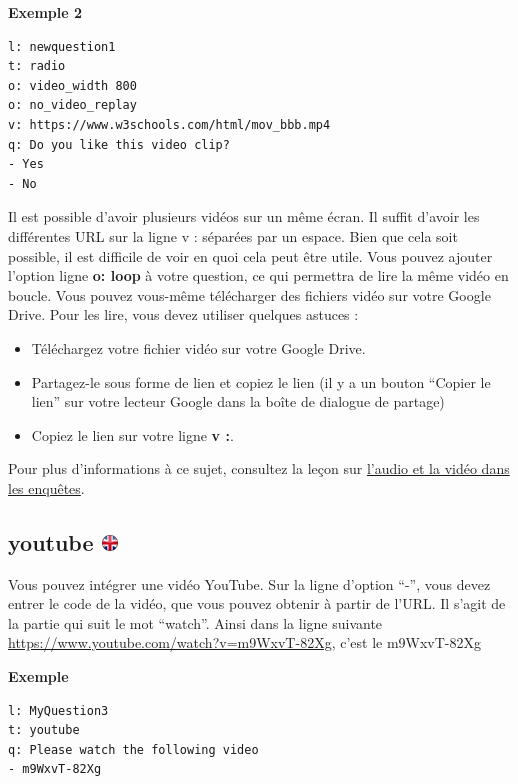 \documentclass[
]{book}
\providecommand{\tightlist}{%
  \setlength{\itemsep}{0pt}\setlength{\parskip}{0pt}}
\begin{document}
\textbf{Exemple 2}

\begin{verbatim}
l: newquestion1
t: radio
o: video_width 800
o: no_video_replay
v: https://www.w3schools.com/html/mov_bbb.mp4
q: Do you like this video clip?
- Yes
- No
\end{verbatim}

Il est possible d'avoir plusieurs vidéos sur un même écran. Il suffit d'avoir les différentes URL sur la ligne v : séparées par un espace. Bien que cela soit possible, il est difficile de voir en quoi cela peut être utile.
Vous pouvez ajouter l'option ligne \textbf{o: loop} à votre question, ce qui permettra de lire la même vidéo en boucle.
Vous pouvez vous-même télécharger des fichiers vidéo sur votre Google Drive. Pour les lire, vous devez utiliser quelques astuces :

\begin{itemize}
\tightlist
\item
  Téléchargez votre fichier vidéo sur votre Google Drive.
\item
  Partagez-le sous forme de lien et copiez le lien (il y a un bouton ``Copier le lien'' sur votre lecteur Google dans la boîte de dialogue de partage)
\item
  Copiez le lien sur votre ligne \textbf{v :}.
\end{itemize}

Pour plus d'informations à ce sujet, consultez la leçon sur \protect\hyperlink{s10}{l'audio et la vidéo dans les enquêtes}.

\hypertarget{youtube}{%
\subsection[youtube ]{\texorpdfstring{youtube \href{https://www.psytoolkit.org/doc3.4.0/online-survey-syntax.html\#youtube}{\protect\includegraphics{img/ukflag.png}}}{youtube }}\label{youtube}}

Vous pouvez intégrer une vidéo YouTube. Sur la ligne d'option ``-'', vous devez entrer le code de la vidéo, que vous pouvez obtenir à partir de l'URL. Il s'agit de la partie qui suit le mot ``watch''. Ainsi dans la ligne suivante \url{https://www.youtube.com/watch?v=m9WxvT-82Xg}, c'est le m9WxvT-82Xg

\textbf{Exemple}

\begin{verbatim}
l: MyQuestion3
t: youtube
q: Please watch the following video
- m9WxvT-82Xg
\end{verbatim}
\end{document}
